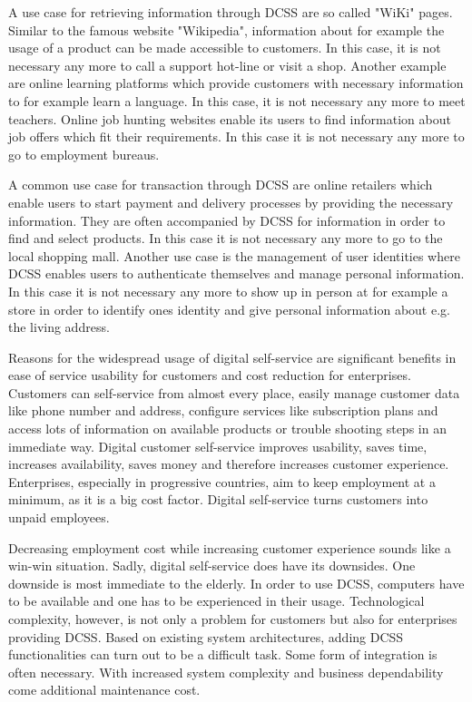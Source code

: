 \documentclass[
     12pt,         %
     a4paper,      %
     BCOR=10mm,version=first,     %
     DIV=14,version=first,        %
     ]{scrreprt}
\begin{document}
A use case for retrieving information through DCSS are so called "WiKi" pages. Similar to the famous website "Wikipedia", information about for example the usage of a product can be made accessible to customers. In this case, it is not necessary any more to call a support hot-line or visit a shop. Another example are online learning platforms which provide customers with necessary information to for example learn a language. In this case, it is not necessary any more to meet teachers. Online job hunting websites enable its users to find information about job offers which fit their requirements. In this case it is not necessary any more to go to employment bureaus.

A common use case for transaction through DCSS are online retailers which enable users to start payment and delivery processes by providing the necessary information. They are often accompanied by DCSS for information in order to find and select products. In this case it is not necessary any more to go to the local shopping mall. Another use case is the management of user identities where DCSS enables users to authenticate themselves and manage personal information. In this case it is not necessary any more to show up in person at for example a store in order to identify ones identity and give personal information about e.g. the living address.

Reasons for the widespread usage of digital self-service are significant benefits in ease of service usability for customers and cost reduction for enterprises. Customers can self-service from almost every place, easily manage customer data like phone number and address, configure services like subscription plans and access lots of information on available products or trouble shooting steps in an immediate way. Digital customer self-service improves usability, saves time, increases availability, saves money and therefore increases customer experience.
Enterprises, especially in progressive countries, aim to keep employment at a minimum, as it is a big cost factor. Digital self-service turns customers into unpaid employees.

Decreasing employment cost while increasing customer experience sounds like a win-win situation. Sadly, digital self-service does have its downsides. One downside is most immediate to the elderly. In order to use DCSS, computers have to be available and one has to be experienced in their usage. Technological complexity, however, is not only a problem for customers but also for enterprises providing DCSS. Based on existing system architectures, adding DCSS functionalities can turn out to be a difficult task. Some form of integration is often necessary. With increased system complexity and business dependability come additional maintenance cost.
\end{document}

